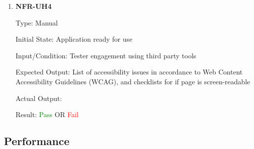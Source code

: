 \documentclass[12pt, titlepage]{article}
\begin{document}
\begin{enumerate}
\item{\textbf{NFR-UH4}} \label{NFR:UH4}

Type: Manual

Initial State: Application ready for use

Input/Condition: Tester engagement using third party tools

Expected Output: List of accessibility issues in accordance to Web Content
Accessibility Guidelines (WCAG), and checklists for if page is screen-readable

Actual Output:

Result: \textcolor{green}{Pass} OR \textcolor{red}{Fail}
\end{enumerate}

\subsection{Performance}
\end{document}
